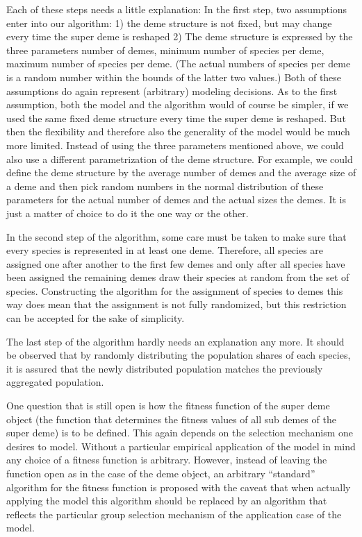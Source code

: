 Each of these steps needs a little explanation: In the first step, two
assumptions enter into our algorithm: 1) the deme structure is not
fixed, but may change every time the super deme is reshaped 2) The deme
structure is expressed by the three parameters number of demes, minimum
number of species per deme, maximum number of species per deme.
(The actual numbers of species per deme is a random number within the
bounds of the latter two values.) Both of
these assumptions do again represent (arbitrary) modeling decisions. As to the
first assumption, both the model and the algorithm would of course be
simpler, if we used the same fixed deme structure every time the
super deme is reshaped. But then the flexibility and therefore also the
generality of the model would be much more limited. Instead of using the three
parameters mentioned above, we could also use a different parametrization
of the deme structure. For example, we could define the deme structure by the
average number of demes and the average size of a deme and then pick random
numbers in the normal distribution of these parameters for the actual number
of demes and the actual sizes the demes. It is just a matter of choice to do
it the one way or the other.

In the second step of the algorithm, some care must be taken to make
sure that every species is represented in at least one deme. Therefore,
all species are assigned one after another to the first few demes and
only after all species have been assigned the remaining demes draw
their species at random from the set of species. Constructing the
algorithm for the assignment of species to demes this way does mean
that the assignment is not fully randomized, but this restriction can be
accepted for the sake of simplicity.

The last step of the algorithm hardly needs an explanation any
more. It should be observed that by randomly distributing the
population shares of each species, it is assured that the newly
distributed population matches the previously aggregated population.

One question that is still open is how the fitness function of the super deme
object (the function that determines the fitness values of all sub demes of
the super deme) is to be defined. This again depends on the selection mechanism
one desires to model. Without a particular empirical application of the model
in mind any choice of a fitness function is arbitrary. However, instead of
leaving the function open as in the case of the deme object, an arbitrary
``standard'' algorithm for the fitness function is proposed with the caveat
that when actually applying the model this algorithm should be replaced by an
algorithm that reflects the particular group selection mechanism of the
application case of the model.

